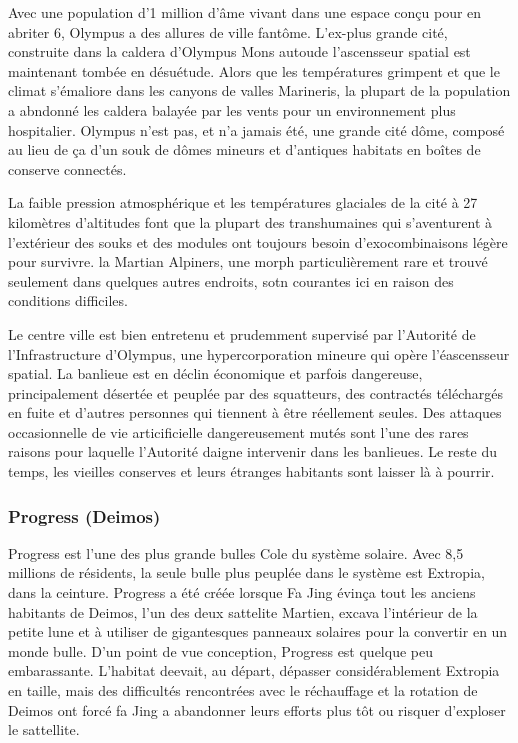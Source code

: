 Avec une population d'1 million d'âme vivant dans une espace conçu pour en abriter 6, Olympus a des allures de ville fantôme. L'ex-plus grande cité, construite dans la caldera d'Olympus Mons autoude l'ascensseur spatial est maintenant tombée en désuétude. Alors que les températures grimpent et que le climat s'émaliore dans les canyons de valles Marineris, la plupart de la population a abndonné les caldera balayée par les vents pour un environnement plus hospitalier. Olympus n'est pas, et n'a jamais été, une grande cité dôme, composé au lieu de ça d'un souk de dômes mineurs et d'antiques habitats en boîtes de conserve connectés. 

La faible pression atmosphérique et les températures glaciales de la cité à 27 kilomètres d'altitudes font que la plupart des transhumaines qui s'aventurent à l'extérieur des souks et des modules ont toujours besoin d'exocombinaisons légère pour survivre. la Martian Alpiners, une morph particulièrement rare et trouvé seulement dans quelques autres endroits, sotn courantes ici en raison des conditions difficiles. 

Le centre ville est bien entretenu et prudemment supervisé par l'Autorité de l'Infrastructure d'Olympus, une hypercorporation mineure qui opère l'éascensseur spatial. La banlieue est en déclin économique et parfois dangereuse, principalement désertée et peuplée par des squatteurs, des contractés téléchargés en fuite et d'autres personnes qui tiennent à être réellement seules. Des attaques occasionnelle de vie articificielle dangereusement mutés sont l'une des rares raisons pour laquelle l'Autorité daigne intervenir dans les banlieues. Le reste du temps, les vieilles conserves et leurs étranges habitants sont laisser là à pourrir. 

\subsubsection{Progress (Deimos)} \label{sec:progress-deimos} 

Progress est l'une des plus grande bulles Cole du système solaire. Avec 8,5 millions de résidents, la seule bulle plus peuplée dans le système est Extropia, dans la ceinture. Progress a été créée lorsque Fa Jing évinça tout les anciens habitants de Deimos, l'un des deux sattelite Martien, excava l'intérieur de la petite lune et à utiliser de gigantesques panneaux solaires pour la convertir en un monde bulle. D'un point de vue conception, Progress est quelque peu embarassante. L'habitat deevait, au départ, dépasser considérablement Extropia en taille, mais des difficultés rencontrées avec le réchauffage et la rotation de Deimos ont forcé fa Jing a abandonner leurs efforts plus tôt ou risquer d'exploser le sattellite. 

